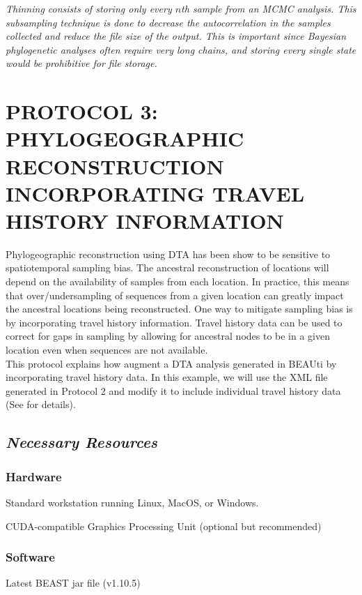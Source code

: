 \documentclass{article}
\newcommand{\ann}[1]{
\begin{adjustwidth}{0.5cm}{}
\it{#1}\\
\end{adjustwidth}}
\begin{document}
\ann{Thinning consists of storing only every $n$th sample from an MCMC analysis. This subsampling technique is done to decrease the autocorrelation in the samples collected and reduce the file size of the output. This is important since Bayesian phylogenetic analyses often require very long chains, and storing every single state would be prohibitive for file storage.}

\section*{PROTOCOL 3: PHYLOGEOGRAPHIC RECONSTRUCTION INCORPORATING TRAVEL HISTORY INFORMATION}

Phylogeographic reconstruction using DTA has been show to be sensitive to spatiotemporal sampling bias. The ancestral reconstruction of locations will depend on the availability of samples from each location. In practice, this means that over/undersampling of sequences from a given location can greatly impact the ancestral locations being reconstructed. One way to mitigate sampling bias is by incorporating travel history information. Travel history data can be used to correct for gaps in sampling by allowing for ancestral nodes to be in a given location even when sequences are not available.\\

This protocol explains how augment a DTA analysis generated in BEAUti by incorporating travel history data. In this example, we will use the XML file generated in Protocol 2 and modify it to include individual travel history data (See \cite{travhist} for details).

\subsection*{\textbf{\textit{Necessary Resources}}}
\subsubsection*{Hardware}
\hspace{0.5cm}Standard workstation running Linux, MacOS, or Windows.

\hspace{0.5cm}CUDA-compatible Graphics Processing Unit (optional but recommended)

\subsubsection*{Software}
\hspace{0.5cm}Latest BEAST jar file (v1.10.5)
\end{document}
